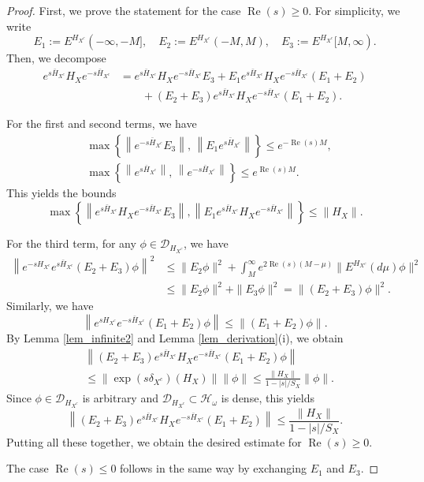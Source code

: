 \documentclass[10pt,a4paper]{amsart}
\begin{document}
\begin{proof}
First, we prove the statement for the case $\operatorname{Re}(s)\geq0$. For simplicity, we write
\[
E_1:=E^{H_{X^c}}(-\infty,-M],\quad
E_2:=E^{H_{X^c}}(-M,M),\quad
E_3:=E^{H_{X^c}}[M,\infty).
\]
Then, we decompose
\begin{align*}
e^{s\bar{H}_{X^c}}H_X e^{-s\bar{H}_{X^c}}
&= e^{s\bar{H}_{X^c}} H_X e^{-s\bar{H}_{X^c}}E_3
+ E_1 e^{s\bar{H}_{X^c}} H_X e^{-s\bar{H}_{X^c}}(E_1+E_2)\\
&\qquad+(E_2+E_3) e^{s\bar{H}_{X^c}} H_X e^{-s\bar{H}_{X^c}}(E_1+E_2).
\end{align*}

For the first and second terms, we have
\begin{align*}
&\max\left\{ \left\|e^{-s\bar{H}_{X^c}} E_3\right\|,\,
\left\|E_1 e^{s\bar{H}_{X^c}}\right\| \right\}\leq e^{-\operatorname{Re}(s) M},\\
&\max\left\{\left\| e^{s\bar{H}_{X^c}}\right\|,\,
\left\|e^{-s\bar{H}_{X^c}}\right\|\right\} \leq e^{\operatorname{Re}(s) M}. 
\end{align*}
This yields the bounds
\[
\max\left\{
\left\|
e^{s\bar{H}_{X^c}} H_X e^{-s\bar{H}_{X^c}} E_3
\right\|,
\left\|
E_1 e^{s\bar{H}_{X^c}} H_X e^{-s\bar{H}_{X^c}}
\right\|
\right\}
\leq \|H_X\|.
\]

For the third term, for any $\phi\in\mathcal{D}_{H_{X^c}}$, we have
\begin{align*}
\left\|
e^{-sH_{X^c}}e^{s\bar{H}_{X^c}}
(E_2+E_3)\phi
\right\|^2
&\leq \|E_2\phi\|^2+
\int_M^\infty e^{2\operatorname{Re}(s)(M-\mu)} \|E^{H_{X^c}}(d\mu)\phi\|^2\\
&\leq \|E_2\phi\|^2+ \|E_3\phi\|^2
=\|(E_2+E_3)\phi\|^2.
\end{align*}
Similarly, we have
\[
\left\|
e^{sH_{X^c}}e^{-s\bar{H}_{X^c}}(E_1+E_2)\phi
\right\|
\leq \|(E_1+E_2)\phi\|.
\]
By Lemma \ref{lem_infinite2} and Lemma \ref{lem_derivation}(i), we obtain
\begin{align*}
&\left\|
(E_2+E_3) e^{s\bar{H}_{X^c}} H_X e^{-s\bar{H}_{X^c}} (E_1+E_2)\phi
\right\|\\
&\leq \|\exp(s\delta_{X^c})(H_X)\| \|\phi\|
\leq \frac{\|H_X\|}{1-|s|/S_X} \|\phi\|.
\end{align*}
Since $\phi\in\mathcal{D}_{H_{X^c}}$ is arbitrary and $\mathcal{D}_{H_{X^c}}\subset\mathcal{H}_\omega$ is dense, this yields
\[
\left\|
(E_2+E_3) e^{s\bar{H}_{X^c}} H_X e^{-s\bar{H}_{X^c}} (E_1+E_2)
\right\|
\leq \frac{\|H_X\|}{1-|s|/S_X}.
\]
Putting all these together, we obtain the desired estimate for $\operatorname{Re}(s)\geq0$. 

The case $\operatorname{Re}(s)\leq0$ follows in the same way by exchanging $E_1$ and $E_3$. 
\end{proof}
\end{document}
